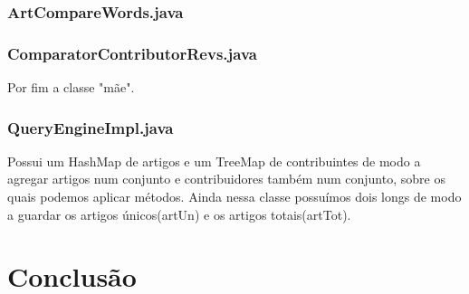 \documentclass[a4paper,12pt,portuguese]{report}
\begin{document}
\subsection{ArtCompareWords.java}

\subsection{ComparatorContributorRevs.java}

Por fim a classe "mãe". 

\subsection{QueryEngineImpl.java}
Possui um HashMap de artigos e um TreeMap de contribuintes de modo a agregar artigos num conjunto e contribuidores também num conjunto, sobre os quais podemos aplicar métodos. Ainda nessa classe possuímos dois longs de modo a guardar os artigos únicos(artUn) e os artigos totais(artTot).

\chapter{Conclusão}
\end{document}
